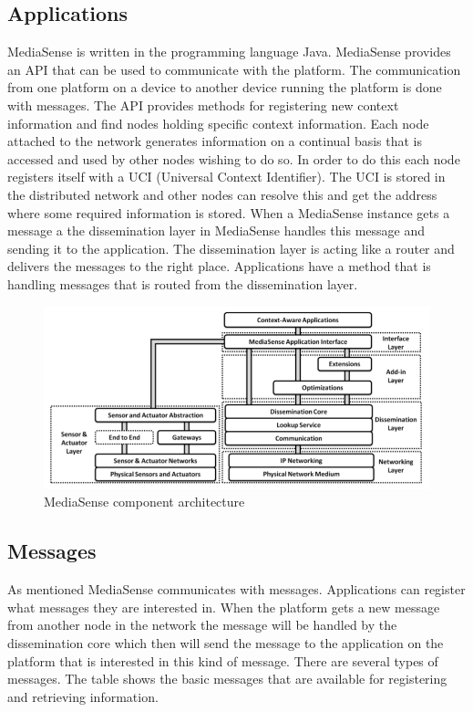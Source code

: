 \subsection{Applications}
MediaSense is written in the programming language Java. MediaSense provides an API that can be used to communicate with the platform. The communication from one platform on a device to another device running the platform is done with messages. The API provides methods for registering new context information and find nodes holding specific context information. Each node attached to the network generates information on a continual basis that is accessed and used by other nodes wishing to do so. In order to do this each node registers itself with a UCI (Universal Context Identifier). The UCI is stored in the distributed network and other nodes can resolve this and get the address where some required information is stored. When a MediaSense instance gets a message a the dissemination layer in MediaSense  handles this message and sending it to the application. The dissemination layer is acting like a router and delivers the messages to the right place. Applications have a method that is handling messages that is routed from the dissemination layer. 

\begin{figure}[t]
	\centering
	\includegraphics[scale=0.50]{part_2/mediasense/ms_arch.png} 	
	\caption{MediaSense component architecture \cite{Kanter539187} }
\end{figure}

\subsection{Messages}
As mentioned MediaSense communicates with messages. Applications can register what messages they are interested in. When the platform gets a new message from another node in the network the message will be handled by the dissemination core which then will send the message to the application on the platform that is interested in this kind of message. There are several types of messages. The table shows the basic messages that are available for registering and retrieving information. 

